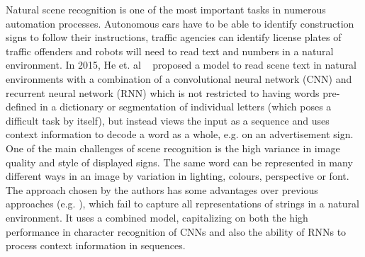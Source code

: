 \documentclass{utue} %
\begin{document}
Natural scene recognition is one of the most important tasks in numerous automation processes. Autonomous cars have to be able to identify construction signs to follow their instructions, traffic agencies can identify license plates of traffic offenders \cite{licenseplates} and robots will need to read text and numbers in a natural environment. In 2015, He et. al ~\cite{2015arXiv150604395H} proposed a model to read scene text in natural environments with a combination of a convolutional neural network (CNN) and recurrent neural network (RNN) which is not restricted to having words pre-defined in a dictionary or segmentation of individual letters (which poses a difficult task by itself), but instead views the input as a sequence and uses context information to decode a word as a whole, e.g. on an advertisement sign. One of the main challenges of scene recognition is the high variance in image quality and style of displayed signs. The same word can be represented in many different ways in an image by variation in lighting, colours, perspective or font. The approach chosen by the authors has some advantages over previous approaches (e.g. \cite{prevapproach1} \cite{prevapproach2}), which fail to capture all representations of strings in a natural environment. It uses a combined model, capitalizing on both the high performance in character recognition of CNNs and also the ability of RNNs to process context information in sequences. \\
\end{document}
